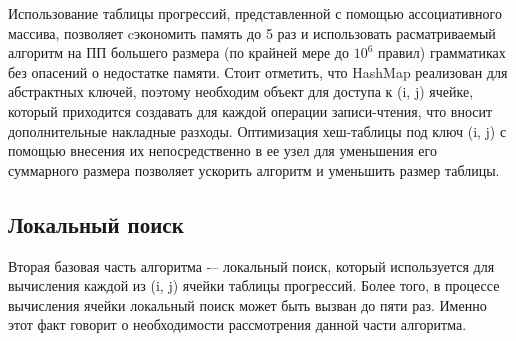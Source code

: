 \documentclass[14pt]{article}
\begin{document}
Использование таблицы прогрессий, представленной с помощью ассоциативного массива, позволяет cэкономить память до 5 раз и использовать расматриваемый алгоритм на ПП большего размера (по крайней мере до $10^6$ правил) грамматиках без опасений о недостатке памяти. Стоит отметить, что HashMap реализован для абстрактных ключей, поэтому необходим объект для доступа к (i, j) ячейке, который приходится создавать для каждой операции записи-чтения, что вносит дополнительные накладные разходы. Оптимизация хеш-таблицы под ключ (i, j) с помощью внесения их непосредственно в ее узел для уменьшения его суммарного размера позволяет ускорить алгоритм и уменьшить размер таблицы. 

\subsection{Локальный поиск}
Вторая базовая часть алгоритма -– локальный поиск, который используется для вычисления каждой из (i, j) ячейки таблицы прогрессий. Более того, в процессе вычисления ячейки локальный поиск может быть вызван до пяти раз. Именно этот факт говорит о необходимости рассмотрения данной части алгоритма.
\end{document}
